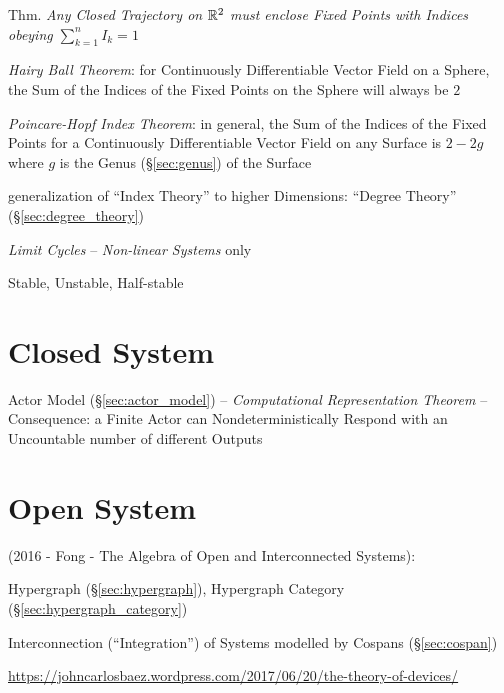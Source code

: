 Thm. \emph{Any Closed Trajectory on $\mathbb{R}^2$ must enclose Fixed Points with
  Indices obeying $\sum_{k=1}^n I_k = 1$}

\emph{Hairy Ball Theorem}: for Continuously Differentiable Vector Field
on a Sphere, the Sum of the Indices of the Fixed Points on the Sphere will
always be $2$

\emph{Poincare-Hopf Index Theorem}: in general, the Sum of the Indices of the
Fixed Points for a Continuously Differentiable Vector Field on any Surface is
$2 - 2g$ where $g$ is the Genus (\S\ref{sec:genus}) of the Surface

generalization of ``Index Theory'' to higher Dimensions: ``Degree Theory''
(\S\ref{sec:degree_theory})


\asterism

\emph{Limit Cycles} -- \emph{Non-linear Systems} only

Stable, Unstable, Half-stable



\section{Closed System}\label{sec:closed_system}


Actor Model (\S\ref{sec:actor_model}) -- \emph{Computational
  Representation Theorem} -- Consequence: a Finite Actor can
Nondeterministically Respond with an Uncountable number of different
Outputs %



\section{Open System}\label{sec:open_system}

(2016 - Fong - The Algebra of Open and Interconnected Systems):

\fist Hypergraph (\S\ref{sec:hypergraph}), Hypergraph Category
(\S\ref{sec:hypergraph_category})

Interconnection (``Integration'') of Systems modelled by Cospans
(\S\ref{sec:cospan})

\url{https://johncarlosbaez.wordpress.com/2017/06/20/the-theory-of-devices/}

